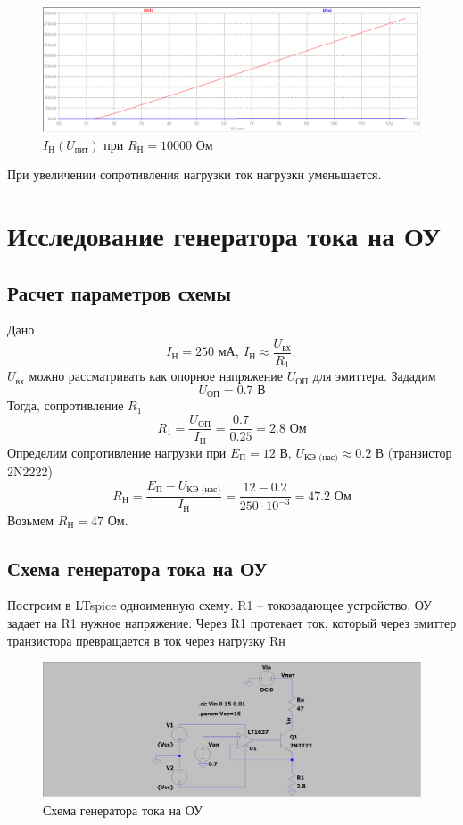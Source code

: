 \documentclass[a4paper, 12pt]{article}
\begin{document}
    \begin{figure}[H]
        \centering
        \includegraphics[scale=0.46]{2task_Iн(Vпит)_Rн10000.png}
        \captionsetup{skip=0pt}
        \caption{$I_\text{Н}\left( U_\text{пит} \right)$ при $R_\text{Н}=10000$ Ом}
        \label{fig:2task_InVlR10000}
    \end{figure}
    \noindent При увеличении сопротивления нагрузки ток нагрузки уменьшается.


    \section{Исследование генератора тока на ОУ}
    \subsection{Расчет параметров схемы}
    Дано
    $$
    I_\text{Н}=250\text{ мА},\ I_\text{Н}\approx\dfrac{U_\text{вх}}{R_1};
    $$
    $U_\text{вх}$ можно рассматривать как опорное напряжение $U_\text{ОП}$ для эмиттера. Зададим
    $$
    U_\text{ОП}=0.7\text{ В}
    $$
    Тогда, сопротивление $R_1$
    $$
    R_1=\dfrac{U_\text{ОП}}{I_\text{Н}}=\dfrac{0.7}{0.25}=2.8\text{ Ом}
    $$
    Определим сопротивление нагрузки при $E_\text{П}=12$ В, $U_\text{КЭ (нас)}\approx0.2$ В (транзистор 2N2222)
    $$
    R_\text{Н}=\dfrac{E_\text{П}-U_\text{КЭ (нас)}}{I_\text{Н}}=\dfrac{12-0.2}{250\cdot10^{-3}}=47.2\text{ Ом}
    $$
    Возьмем $R_\text{Н}=47$ Ом.


    \subsection{Схема генератора тока на ОУ}
    Построим в LTspice одноименную схему. R1 -- токозадающее устройство.
    ОУ задает на R1 нужное напряжение. Через R1 протекает ток, который через
    эмиттер транзистора превращается в ток через нагрузку Rн
    \begin{figure}[H]
        \centering
        \includegraphics[scale=0.22]{scheme3.png}
        \captionsetup{skip=0pt}
        \caption{Схема генератора тока на ОУ}
        \label{fig:scheme3}
    \end{figure}
\end{document}
